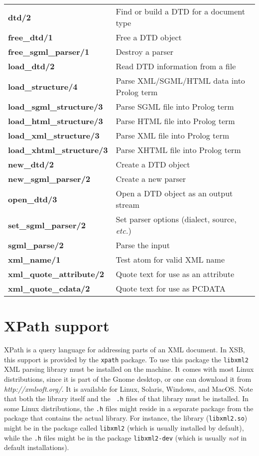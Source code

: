 \begin{longtable}[l]{ll}
  {\bf dtd/2}&Find or build a DTD for a document type\\
  {\bf free\_dtd/1}&Free a DTD object\\
  {\bf free\_sgml\_parser/1}&Destroy a parser\\
  {\bf load\_dtd/2}&Read DTD information from a file\\
  {\bf load\_structure/4}&Parse XML/SGML/HTML data into Prolog term\\
  {\bf load\_sgml\_structure/3}&Parse SGML file into Prolog term \\
  {\bf load\_html\_structure/3}&Parse HTML file into Prolog term\\
  {\bf load\_xml\_structure/3}&Parse XML file into Prolog term\\
  {\bf load\_xhtml\_structure/3}&Parse XHTML file into Prolog term\\
  {\bf new\_dtd/2}&Create a DTD object\\
  {\bf new\_sgml\_parser/2}&Create a new parser\\
  {\bf open\_dtd/3}&Open a DTD object as an output stream\\
  {\bf set\_sgml\_parser/2}&Set parser options (dialect, source, \emph{etc.})\\
  {\bf sgml\_parse/2}&Parse the input\\
  {\bf xml\_name/1}&Test atom for valid XML name\\
  {\bf xml\_quote\_attribute/2}&Quote text for use as an attribute\\
  {\bf xml\_quote\_cdata/2}&Quote text for use as PCDATA\\

\end{longtable}


\section{XPath support}\label{sec-xpath}

XPath is a query language for addressing parts of an XML document.
In XSB, this support is provided by the {\tt xpath} package.
To use this package the {\tt libxml2} XML parsing library must be installed
on the machine. It comes with most Linux distributions, since it is part of
the Gnome desktop, or one can download
it from \emph{http://xmlsoft.org/}. It is available for Linux, Solaris,
Windows, and MacOS. Note that both the library itself and the {\tt
  .h} files of that library must be installed. In some Linux distributions,
the {\tt .h} files might reside in a separate package
from the package that contains the actual library. For instance, the
library ({\tt libxml2.so})  might be in the package called {\tt libxml2}
(which is usually installed by default),
while the {\tt .h} files might be in the package {\tt libxml2-dev}
(which is usually \emph{not} in default installations).

